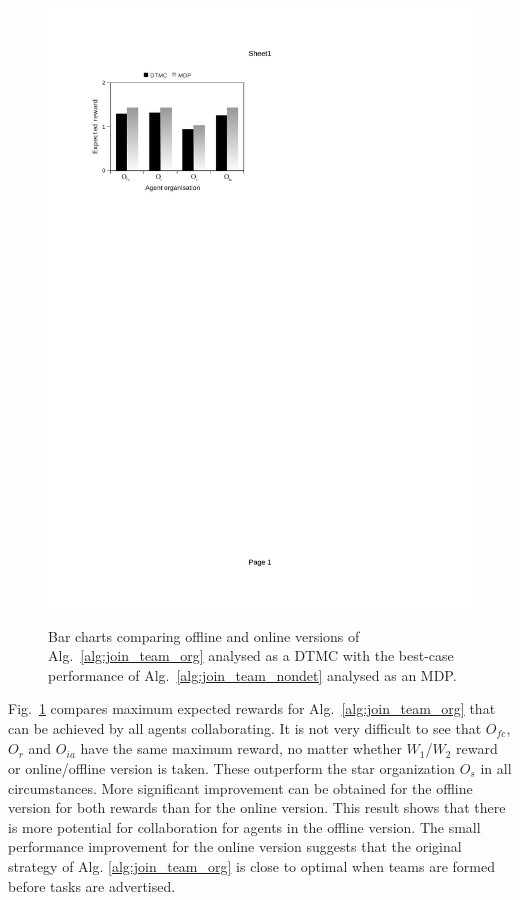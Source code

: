 \documentclass{llncs}
\begin{document}
\begin{figure}[h]
{\includegraphics[clip=true, trim=63 581.5 320 80, scale=0.63]{images/w2_mdp_online}
}
\caption{Bar charts comparing offline and online versions of Alg.~\ref{alg:join_team_org} analysed as a DTMC with the best-case performance of Alg.~\ref{alg:join_team_nondet} analysed as an MDP. }
\label{fig:bar_chart_mdp}
\end{figure}
Fig.~\ref{fig:bar_chart_mdp} compares maximum expected rewards for Alg.~\ref{alg:join_team_org} that can be achieved by all agents collaborating.
It is not very difficult to see that $O_{\mathit{fc}}$, $O_r$ and $O_{ia}$ have the same maximum reward, no matter whether $W_1$/$W_2$ reward or online/offline version is taken. These outperform the star organization $O_s$ in all circumstances.
More significant improvement can be obtained for the offline version for both rewards than for the online version. This result shows that there is more potential for collaboration for agents in the offline version. The small performance improvement for the online version suggests that the original strategy of Alg. \ref{alg:join_team_org} is close to optimal when teams are formed before tasks are advertised.
\end{document}
